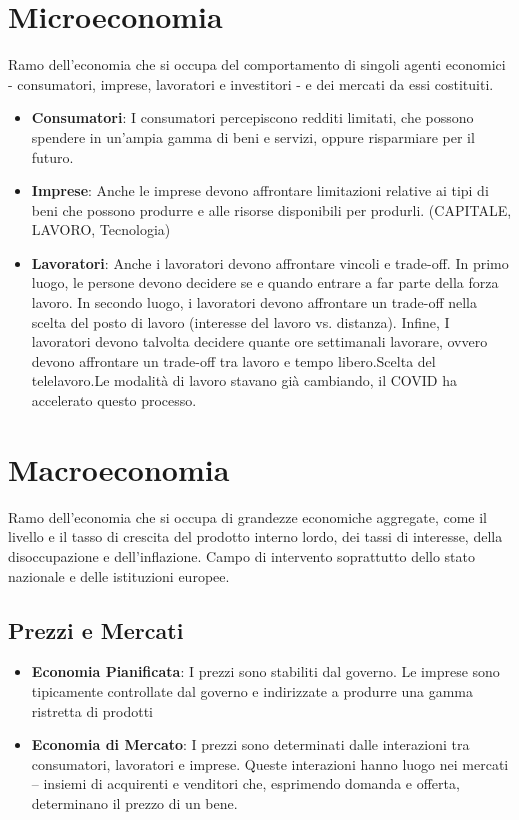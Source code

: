 \documentclass[12pt]{article}
\begin{document}
\section{Microeconomia}
Ramo dell’economia che si occupa del comportamento di singoli agenti economici - consumatori, imprese, lavoratori e investitori - e dei mercati da essi costituiti.
\begin{itemize}
    \item \textbf{Consumatori}: I consumatori percepiscono redditi limitati, che possono spendere in un’ampia gamma di beni e servizi, oppure risparmiare per il futuro.
    \item \textbf{Imprese}: Anche le imprese devono affrontare limitazioni relative ai tipi di beni che possono produrre e alle risorse disponibili per produrli. (CAPITALE, LAVORO, Tecnologia)
    \item \textbf{Lavoratori}: Anche i lavoratori devono affrontare vincoli e trade-off. In primo luogo, le persone devono decidere se e quando entrare a far parte della forza lavoro. In secondo luogo, i lavoratori devono affrontare un trade-off nella scelta del posto di lavoro (interesse del lavoro vs. distanza). Infine, I lavoratori devono talvolta decidere quante ore settimanali lavorare, ovvero devono affrontare un trade-off tra lavoro e tempo libero.Scelta del telelavoro.Le modalità di lavoro stavano già cambiando, il COVID ha accelerato questo processo.
\end{itemize}
\section{Macroeconomia}
Ramo dell’economia che si occupa di grandezze economiche aggregate, come il livello e il tasso di crescita del prodotto interno lordo, dei tassi di interesse, della disoccupazione e dell’inflazione. Campo di intervento soprattutto dello stato nazionale e delle istituzioni europee.
\subsection{Prezzi e Mercati}
\begin{itemize}
    \item \textbf{Economia Pianificata}: I prezzi sono stabiliti dal governo. Le imprese sono tipicamente controllate dal governo e indirizzate a produrre una gamma ristretta di prodotti
    \item\textbf{Economia di Mercato}: I prezzi sono determinati dalle interazioni tra consumatori, lavoratori e imprese. Queste interazioni hanno luogo nei mercati – insiemi di acquirenti e venditori che, esprimendo domanda e offerta, determinano il prezzo di un bene.
\end{itemize}
\end{document}
